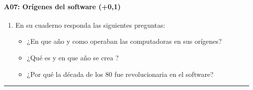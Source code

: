 \documentclass[letterpaper,10pt,spanish]{sphinxmanual}
\begin{document}
\paragraph{A07: Orígenes del software (+0,1)}
\label{\detokenize{cursos/informatica10/periodo01/G01:a07-origenes-del-software-0-1}}
\sphinxAtStartPar
{}
\begin{enumerate}
%
\item {} 
\sphinxAtStartPar
En su cuaderno responda las siguientes preguntas:
\begin{itemize}
\item {} 
\sphinxAtStartPar
¿En que año y como operaban las computadoras en sus orígenes?

\item {} 
\sphinxAtStartPar
¿Qué es y en que año se crea ?

\item {} 
\sphinxAtStartPar
¿Por qué la década de los 80 fue revolucionaria en el software?

\end{itemize}

\end{enumerate}


\bigskip\hrule\bigskip
\end{document}
